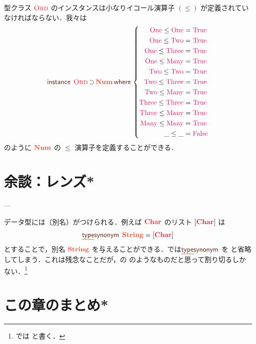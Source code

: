 \documentclass[a5paper,twoside,fleqn,draft]{jsbook}
\begin{document}
型クラス $\hOrd$ のインスタンスは小なりイコール演算子 $(\le)$ が定義されていなければならない．我々は
\begin{equation}
  \mInstanceDecl\;\hOrd\hHasElementsOf\mType{Num}
  \mWhere{}
  \left\{
  \begin{aligned}
    \mNumOne\le\mNumOne&=\hTrue\\
    \mNumOne\le\mNumTwo&=\hTrue\\
    \mNumOne\le\mNumThree&=\hTrue\\
    \mNumOne\le\mNumMany&=\hTrue\\
    \mNumTwo\le\mNumTwo&=\hTrue\\
    \mNumTwo\le\mNumThree&=\hTrue\\
    \mNumTwo\le\mNumMany&=\hTrue\\
    \mNumThree\le\mNumThree&=\hTrue\\
    \mNumThree\le\mNumMany&=\hTrue\\
    \mNumMany\le\mNumMany&=\hTrue\\
    \_\le\_&=\hFalse
  \end{aligned}
  \right.
\end{equation}
のように $\mType{Num}$ の $\le$ 演算子を定義することができる．

\section{余談：レンズ*}



---


データ型には（別名）がつけられる．例えば $\hChar$ のリスト $[\hChar]$ は
\begin{equation}
  \mTypeSynonymDecl\;
  \mStringType
  =[\hChar]
\end{equation}
とすることで，別名 $\mStringType$ を与えることができる．\haskell では$\mTypeSynonymDecl$ を  と省略してしまう．これは残念なことだが，\clang の  のようなものだと思って割り切るしかない．\footnote{\haskell では  と書く．}

\section{この章のまとめ*}
\end{document}
